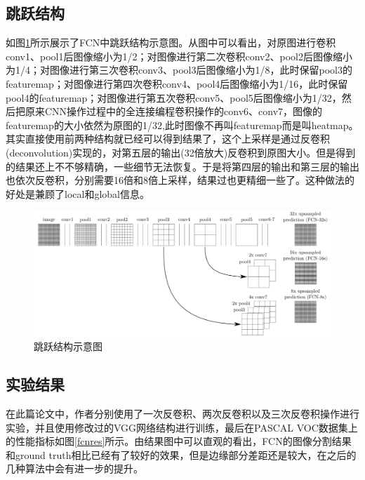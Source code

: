\documentclass[cn]{elegantbook}
\begin{document}
\subsection{跳跃结构}
如图\ref{skip}所示展示了FCN中跳跃结构示意图。从图中可以看出，对原图进行卷积conv1、pool1后图像缩小为1/2；对图像进行第二次卷积conv2、pool2后图像缩小为1/4；对图像进行第三次卷积conv3、pool3后图像缩小为1/8，此时保留pool3的featuremap；对图像进行第四次卷积conv4、pool4后图像缩小为1/16，此时保留pool4的featuremap；对图像进行第五次卷积conv5、pool5后图像缩小为1/32，然后把原来CNN操作过程中的全连接编程卷积操作的conv6、conv7，图像的featuremap的大小依然为原图的1/32,此时图像不再叫featuremap而是叫heatmap。其实直接使用前两种结构就已经可以得到结果了，这个上采样是通过反卷积(deconvolution)实现的，对第五层的输出(32倍放大)反卷积到原图大小。但是得到的结果还上不不够精确，一些细节无法恢复。于是将第四层的输出和第三层的输出也依次反卷积，分别需要16倍和8倍上采样，结果过也更精细一些了。这种做法的好处是兼顾了local和global信息。

\begin{figure}[ht]
	\centering
	\includegraphics[width=\textwidth]{images/skip.png}
	\caption{\label{skip}跳跃结构示意图}
\end{figure}

\subsection{实验结果}
在此篇论文中，作者分别使用了一次反卷积、两次反卷积以及三次反卷积操作进行实验，并且使用修改过的VGG网络结构进行训练，最后在PASCAL VOC数据集上的性能指标如图\ref{fcnres}所示。由结果图中可以直观的看出，FCN的图像分割结果和ground truth相比已经有了较好的效果，但是边缘部分差距还是较大，在之后的几种算法中会有进一步的提升。
\end{document}
